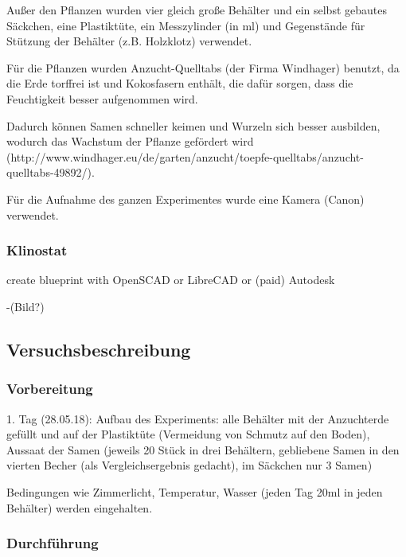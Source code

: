 \documentclass[
a4paper, 
11pt, 
ngerman,
listof=totoc,
bibliography=totocnumbered,
abstracton
]{scrreprt}
\begin{document}
Außer den Pflanzen wurden vier gleich große Behälter und ein selbst gebautes Säckchen, eine Plastiktüte, ein Messzylinder (in ml) und Gegenstände für Stützung der Behälter (z.B. Holzklotz) verwendet.

Für die Pflanzen wurden Anzucht-Quelltabs (der Firma Windhager) benutzt, da die Erde torffrei ist und Kokosfasern enthält, die dafür sorgen, dass die Feuchtigkeit besser aufgenommen wird.

Dadurch können Samen schneller keimen und Wurzeln sich besser ausbilden, wodurch das Wachstum der Pflanze gefördert wird (http://www.windhager.eu/de/garten/anzucht/toepfe-quelltabs/anzucht-quelltabs-49892/). 

Für die Aufnahme des ganzen Experimentes wurde eine Kamera (Canon) verwendet.


\subsubsection{Klinostat}

create blueprint with OpenSCAD or LibreCAD or (paid) Autodesk

-(Bild?)

\subsection{Versuchsbeschreibung}

\subsubsection{Vorbereitung}

1. Tag (28.05.18): Aufbau des Experiments: alle Behälter mit der Anzuchterde gefüllt und auf der Plastiktüte (Vermeidung von Schmutz auf den Boden), Aussaat der Samen (jeweils 20 Stück in drei Behältern, gebliebene Samen in den vierten Becher (als Vergleichsergebnis gedacht), im Säckchen nur 3 Samen)

Bedingungen wie Zimmerlicht, Temperatur, Wasser (jeden Tag 20ml in jeden Behälter) werden eingehalten.



\subsubsection{Durchführung}

\end{document}

